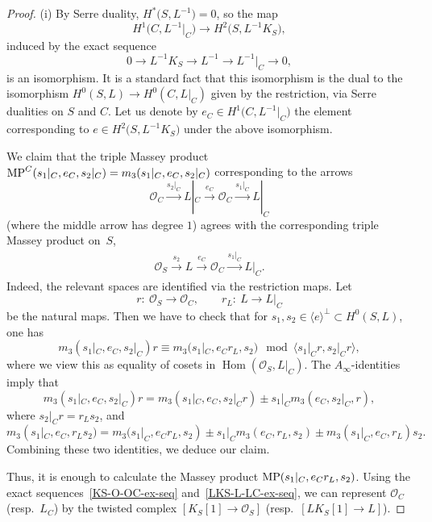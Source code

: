 \documentclass[10pt,a4paper]{amsart}
\numberwithin{equation}{section}
\newcommand{\Hom}{\operatorname{Hom}}
\newcommand{\OO}{{\mathcal O}}
\newcommand{\sub}{\subset}
\newcommand{\lan}{\langle}
\newcommand{\ran}{\rangle}
\begin{document}
\begin{proof}
(i) By Serre duality, $H^*\big(S,L^{-1}\big)=0$, so
the map
\[
H^1\big(C,L^{-1}\big|_C\big)\to H^2\big(S,L^{-1}K_S\big),
\]
induced by the exact sequence
\[
0\to L^{-1}K_S\to L^{-1}\to L^{-1}\big|_C\to 0,
\]
is an isomorphism.
It is a standard fact that this isomorphism is the dual to the isomorphism $H^0(S,L)\to H^0(C,L|_C)$ given by the restriction, via Serre dualities on $S$ and $C$.
Let us denote by $e_C\in H^1\big(C,L^{-1}\big|_C\big)$ the element corresponding to $e\in H^2\big(S,L^{-1}K_S\big)$ under the above isomorphism.

We claim that the triple Massey product ${\rm MP}^C(s_1|_C,e_C,s_2|_C)=m_3(s_1|_C,e_C,s_2|_C)$ corresponding to the arrows
\[\OO_C\overset{s_2|_C}{\longrightarrow} L|_C \overset{e_C}{\longrightarrow} \OO_C\overset{s_1|_C}{\longrightarrow} L|_C\]
(where the middle arrow has degree $1$) agrees with the corresponding triple Massey product on~$S$,
\begin{gather*}
\OO_S\overset{s_2}{\longrightarrow} L\overset{e_C}{\longrightarrow}\OO_C\overset{s_1|_C}{\longrightarrow} L|_C.
\end{gather*}
Indeed, the relevant spaces are identified via the restriction maps. Let
\[
r\colon \ \OO_S\to \OO_C, \qquad r_L\colon \ L\to L|_C
\]
 be the natural maps.
Then we have to check that for $s_1,s_2\in \lan e\ran^\perp\sub H^0(S,L)$, one has
\[m_3(s_1|_C,e_C,s_2|_C) r\equiv m_3(s_1|_C,e_Cr_L,s_2) \mod \lan s_1|_C r,s_2|_C r\ran,\]
where we view this as equality of cosets in $\Hom(\OO_S,L|_C)$.
The $A_\infty$-identities imply that
\[m_3(s_1|_C,e_C,s_2|_C)r= m_3(s_1|_C,e_C,s_2|_Cr)\pm s_1|_Cm_3(e_C,s_2|_C,r),\]
where $s_2|_Cr=r_Ls_2$, and
\[m_3(s_1|_C,e_C,r_Ls_2)=m_3(s_1|_C,e_Cr_L,s_2)\pm s_1|_Cm_3(e_C,r_L,s_2)\pm m_3(s_1|_C,e_C,r_L)s_2.\]
Combining these two identities, we deduce our claim.

Thus, it is enough to calculate the Massey product ${\rm MP}(s_1|_C,e_Cr_L,s_2)$.
Using the exact sequences~\eqref{KS-O-OC-ex-seq} and~\eqref{LKS-L-LC-ex-seq}, we can represent $\OO_C$ (resp.\ $L_C$) by the twisted complex $[K_S[1]\to \OO_S]$
(resp.\ $[LK_S[1]\to L]$).


\end{proof}
\end{document}
